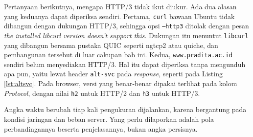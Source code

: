 Pertanyaan berikutnya, mengapa HTTP/3 tidak ikut diukur. Ada dua alasan yang
keduanya dapat diperiksa sendiri. Pertama, \texttt{curl} bawaan Ubuntu tidak
dibangun dengan dukungan HTTP/3, sehingga opsi \texttt{--http3} ditolak dengan
pesan \emph{the installed libcurl version doesn't support this}. Dukungan itu
menuntut \texttt{libcurl} yang dibangun bersama pustaka QUIC seperti ngtcp2 atau
quiche, dan pembangunan tersebut di luar cakupan bab ini. Kedua,
\texttt{www.pradita.ac.id} sendiri belum menyediakan HTTP/3. Hal itu dapat
diperiksa tanpa mengunduh apa pun, yaitu lewat header \texttt{alt-svc} pada
\textit{response}, seperti pada Listing \ref{lst:altsvc}. Pada browser, versi yang
benar-benar dipakai terlihat pada kolom \emph{Protocol}, dengan nilai
\texttt{h2} untuk HTTP/2 dan \texttt{h3} untuk HTTP/3.



Angka waktu berubah tiap kali pengukuran dijalankan, karena bergantung pada
kondisi jaringan dan beban server. Yang perlu dilaporkan adalah pola
perbandingannya beserta penjelasannya, bukan angka persisnya.

